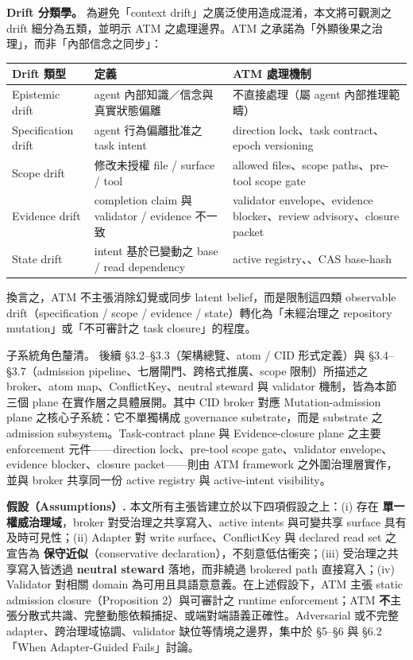 \documentclass[a4paper,fontset=none]{ctexart}
\begin{document}
\textbf{Drift 分類學。} 為避免「context drift」之廣泛使用造成混淆，本文將可觀測之 drift 細分為五類，並明示 ATM 之處理邊界。ATM 之承諾為「外顯後果之治理」，而非「內部信念之同步」：

\begingroup
\footnotesize
{}
\begin{longtable}{L{0.28\textwidth}L{0.28\textwidth}L{0.28\textwidth}}
\toprule
Drift 類型 & 定義 & ATM 處理機制 \\
\midrule
Epistemic drift & agent 內部知識／信念與真實狀態偏離 & 不直接處理（屬 agent 內部推理範疇） \\
Specification drift & agent 行為偏離批准之 task intent & direction lock、task contract、epoch versioning \\
Scope drift & 修改未授權 file / surface / tool & allowed files、scope paths、pre-tool scope gate \\
Evidence drift & completion claim 與 validator / evidence 不一致 & validator envelope、evidence blocker、review advisory、closure packet \\
State drift & intent 基於已變動之 base / read dependency & active registry、\texttt{}、CAS base-hash \\
\bottomrule
\end{longtable}
\endgroup

換言之，ATM 不主張消除幻覺或同步 latent belief，而是限制這四類 observable drift（specification / scope / evidence / state）轉化為「未經治理之 repository mutation」或「不可審計之 task closure」的程度。

子系統角色釐清。 後續 §3.2--§3.3（架構總覽、atom / CID 形式定義）與 §3.4--§3.7（admission pipeline、七層閘門、跨格式推廣、scope 限制）所描述之 broker、atom map、ConflictKey、neutral steward 與 validator 機制，皆為本節三個 plane 在實作層之具體展開。其中 CID broker 對應 Mutation-admission plane 之核心子系統：它不單獨構成 governance substrate，而是 substrate 之 admission subsystem。Task-contract plane 與 Evidence-closure plane 之主要 enforcement 元件------direction lock、pre-tool scope gate、validator envelope、evidence blocker、closure packet------則由 ATM framework 之外圍治理層實作，並與 broker 共享同一份 active registry 與 active-intent visibility。

\textbf{假設（Assumptions）.} 本文所有主張皆建立於以下四項假設之上：(i) 存在 \textbf{單一權威治理域}，broker 對受治理之共享寫入、active intents 與可變共享 surface 具有及時可見性；(ii) Adapter 對 write surface、ConflictKey 與 declared read set 之宣告為 \textbf{保守近似}（conservative declaration），不刻意低估衝突；(iii) 受治理之共享寫入皆透過 \textbf{neutral steward} 落地，而非繞過 brokered path 直接寫入；(iv) Validator 對相關 domain 為可用且具語意意義。在上述假設下，ATM 主張 static admission closure（Proposition 2）與可審計之 runtime enforcement；ATM \textbf{不}主張分散式共識、完整動態依賴捕捉、或端對端語義正確性。Adversarial 或不完整 adapter、跨治理域協調、validator 缺位等情境之邊界，集中於 §5--§6 與 §6.2「When Adapter-Guided Fails」討論。
\end{document}
